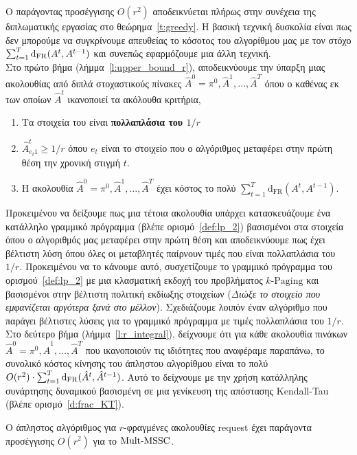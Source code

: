 \noindent Ο παράγοντας προσέγγισης $O(r^2)$ αποδεικνύεται πλήρως στην συνέχεια της διπλωματικής εργασίας στο θεώρημα~\ref{t:greedy}. Η βασική τεχνική δυσκολία είναι πως δεν μπορούμε να συγκρίνουμε απευθείας το κόσοτος του αλγορίθμου μας με τον στόχο $\sum_{t=1}^T \mathrm{d}_{\mathrm{FR}}(A^t,A^{t-1})$ και συνεπώς εφαρμόζουμε μια άλλη τεχνική. \\

Στο πρώτο βήμα (λήμμα~\ref{l:upper_bound_r}), αποδεικνύουμε την ύπαρξη μιας ακολουθίας από διπλά στοχαστικούς πίνακες $\hat{A}^0 =\pi^0,\hat{A}^1,\ldots,\hat{A}^T$ όπου ο καθένας εκ των οποίων  $\hat{A}^t$ ικανοποιεί τα ακόλουθα κριτήρια,

\begin{enumerate}
    \item Τα στοιχεία του είναι \textbf{πολλαπλάσια του $1/r$}
    \item $\hat{A}^t_{e_t 1} \geq 1/r$ όπου $e_t$ είναι το στοιχείο που ο αλγόριθμος μεταφέρει στην πρώτη θέση την χρονική στιγμή $t$.
    \item Η ακολουθία $\hat{A}^0 =\pi^0,\hat{A}^1,\ldots,\hat{A}^T$ έχει κόστος το πολύ $\sum_{t=1}^T \mathrm{d}_{\mathrm{FR}}(A^t,A^{t-1})$.
\end{enumerate}

Προκειμένου να δείξουμε πως μια τέτοια ακολουθία υπάρχει κατασκευάζουμε ένα κατάλληλο γραμμικό πρόγραμμα (βλέπε ορισμό~\ref{def:lp_2}) βασισμένοι στα στοιχεία όπου ο αλγοριθμός μας μεταφέρει στην πρώτη θέση και αποδεικνύουμε πως έχει βέλτιστη λύση όπου όλες οι μεταβλητές παίρνουν τιμές που είναι πολλαπλάσια του $1/r$. Προκειμένου να το κάνουμε αυτό, συσχετίζουμε το γραμμικό πρόγραμμα του ορισμού~\ref{def:lp_2} με μια κλασματική εκδοχή του προβλήματος $k$-$\mathrm{Paging}$ \cite{BBN12} και βασισμένοι στην βέλτιστη πολιτική εκδίωξης στοιχείων 
(\textit{Διώξε το στοιχείο που εμφανίζεται αργότερα ξανά στο μέλλον}). Σχεδιάζουμε λοιπόν έναν αλγόριθμο που παράγει βέλτιστες λύσεις για το γραμμικό πρόγραμμα με τιμές πολλαπλάσια του $1/r$. \\

Στο δεύτερο βήμα (λήμμα~\ref{l:r_integral}), δείχνουμε ότι για κάθε ακολουθία πινάκων $\hat{A}^0 =\pi^0,\hat{A}^1,\ldots,\hat{A}^T$ που ικανοποιούν τις ιδιότητες που αναφέραμε παραπάνω, το συνολικό κόστος κίνησης του άπληστου αλγορίθμου είναι το πολύ $O(r^2) \cdot \sum_{t=1}^T \mathrm{d}_{\mathrm{FR}}(\hat{A}^t,\hat{A}^{t-1})$. Αυτό το δείχνουμε με την χρήση κατάλληλης συνάρτησης δυναμικού βασισμένη σε μια γενίκευση της απόστασης Kendall-Tau (βλέπε ορισμό~\ref{d:frac_KT}).

\begin{θεώρημα}\label{t:greedy}
Ο άπληστος αλγόριθμος για $r$-φραγμένες ακολουθίες request έχει παράγοντα προσέγγισης $O(r^2)$ για το $\mathrm{Mult}\text{-}\mathrm{MSSC}$.
\end{θεώρημα}